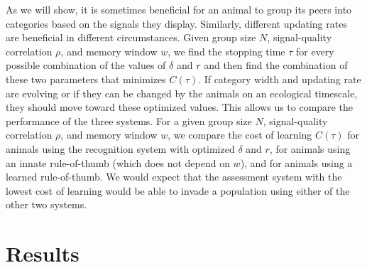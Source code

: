As we will show, it is sometimes beneficial for an animal to group its peers into categories based on the signals they display. Similarly, different updating rates are beneficial in different circumstances. Given group size $N$, signal-quality correlation $\rho$, and memory window $w$, we find the stopping time $\tau$ for every possible combination of the values of $\delta$ and $r$ and then find the combination of these two parameters that minimizes $C(\tau)$. If category width and updating rate are evolving or if they can be changed by the animals on an ecological timescale, they should move toward these optimized values. This allows us to compare the performance of the three systems. For a given group size $N$, signal-quality correlation $\rho$, and memory window $w$, we compare the cost of learning $C(\tau)$ for animals using the recognition system with optimized $\delta$ and $r$, for animals using an innate rule-of-thumb (which does not depend on $w$), and for animals using a learned rule-of-thumb. We would expect that the assessment system with the lowest cost of learning would be able to invade a population using either of the other two systems.

\section*{Results}
